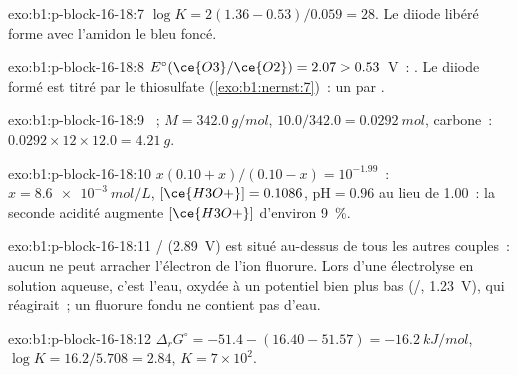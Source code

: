 \begin{solution}{exo:b1:p-block-16-18:7}
$\log K = 2(1.36 - 0.53)/0.059 = 28$. Le diiode libéré forme avec
l'amidon le  bleu foncé.
\end{solution}

\begin{solution}{exo:b1:p-block-16-18:8}
$E^\circ(\ce{O3}/\ce{O2}) = 2.07 > 0.53$~V~: . Le diiode formé est titré par le thiosulfate
(\cref{exo:b1:nernst:7})~: un  par .
\end{solution}

\begin{solution}{exo:b1:p-block-16-18:9}
~; $M = \qty{342.0}{g/mol}$, $10.0/342.0 =
\qty{0.0292}{mol}$, carbone~: $0.0292 \times 12 \times 12.0 = \qty{4.21}{g}$.
\end{solution}

\begin{solution}{exo:b1:p-block-16-18:10}
$x(0.10 + x)/(0.10 - x) = 10^{-1.99}$~: $x = \qty{8.6e-3}{mol/L}$,
$[\ce{H3O+}] = 0.1086$, $\mathrm{pH} = 0.96$ au lieu de 1.00~: la seconde
acidité augmente $[\ce{H3O+}]$ d'environ \qty{9}{\percent}.
\end{solution}

\begin{solution}{exo:b1:p-block-16-18:11}
/ (2.89~V) est situé au-dessus de tous les autres
couples~: aucun  ne peut arracher l'électron de l'ion fluorure.
Lors d'une électrolyse en solution aqueuse, c'est l'eau, oxydée à un
potentiel bien plus bas (/, 1.23~V), qui réagirait~; un
fluorure fondu ne contient pas d'eau.
\end{solution}

\begin{solution}{exo:b1:p-block-16-18:12}
$\Delta_r G^\circ = -51.4 - (16.40 - 51.57) = \qty{-16.2}{kJ/mol}$,
$\log K = 16.2/5.708 = 2.84$, $K = 7 \times 10^2$.
\end{solution}


